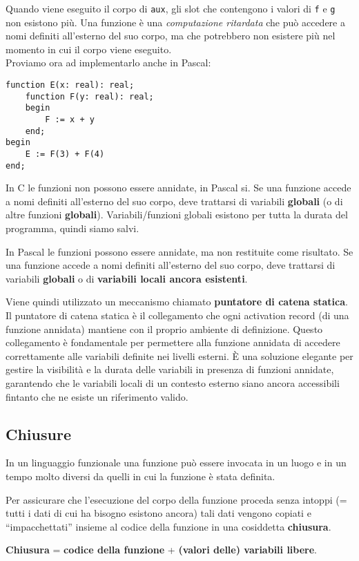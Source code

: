 \documentclass{article}
\begin{document}
Quando viene eseguito il corpo di \texttt{aux}, gli slot che contengono i valori di \texttt{f} e \texttt{g} non esistono più. Una funzione è una \textit{computazione ritardata} che può accedere a nomi definiti all’esterno del suo corpo, ma che potrebbero non esistere più nel momento in cui il corpo viene eseguito.\vspace{14pt}\\
Proviamo ora ad implementarlo anche in Pascal:
\begin{tcolorbox}
\begin{verbatim}
function E(x: real): real;
    function F(y: real): real;
    begin
        F := x + y
    end;
begin
    E := F(3) + F(4)
end;
\end{verbatim}
\end{tcolorbox}

In C le funzioni non possono essere annidate, in Pascal si. Se una funzione accede a nomi definiti all’esterno del suo corpo, deve trattarsi di variabili \textbf{globali} (o di altre funzioni \textbf{globali}).
Variabili/funzioni globali esistono per tutta la durata del programma, quindi siamo salvi.

In Pascal le funzioni possono essere annidate, ma non restituite come risultato. Se una funzione accede a nomi definiti all’esterno del suo corpo, deve trattarsi di variabili \textbf{globali} o di \textbf{variabili locali ancora esistenti}.

Viene quindi utilizzato un meccanismo chiamato \textbf{puntatore di catena statica}. Il puntatore di catena statica è il collegamento che ogni activation record (di una funzione annidata) mantiene con il proprio ambiente di definizione. Questo collegamento è fondamentale per permettere alla funzione annidata di accedere correttamente alle variabili definite nei livelli esterni. È una soluzione elegante per gestire la visibilità e la durata delle variabili in presenza di funzioni annidate, garantendo che le variabili locali di un contesto esterno siano ancora accessibili fintanto che ne esiste un riferimento valido.

\subsection*{Chiusure}
In un linguaggio funzionale una funzione può essere invocata in un luogo e in un tempo molto diversi da quelli in cui la funzione è stata definita.

Per assicurare che l’esecuzione del corpo della funzione proceda senza intoppi (= tutti i dati di cui ha bisogno esistono ancora) tali dati vengono copiati e “impacchettati” insieme al codice della funzione in una cosiddetta \textbf{chiusura}.
\begin{center}
    \textbf{Chiusura} = \textbf{codice della funzione} + \textbf{(valori delle) variabili libere}.    
\end{center}
\end{document}
